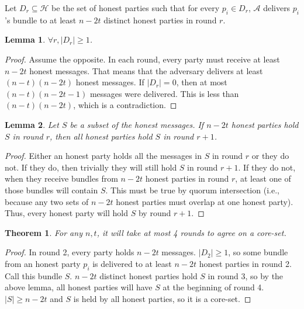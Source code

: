 \documentclass{article}
\newtheorem{lemma}{Lemma}
\newtheorem{theorem}{Theorem}
\begin{document}
Let $D_r \subseteq \mathcal H$ be the set of honest parties such that for every $p_i \in D_r$, $\mathcal A$ delivers $p_i$'s bundle to at least $n - 2t$ distinct honest parties in round $r$.
\begin{lemma}
$\forall r, |D_r| \geq 1$.
\end{lemma}
\begin{proof}
Assume the opposite. In each round, every party must receive at least $n - 2t$ honest messages. That means that the adversary delivers at least $(n-t)(n-2t)$ honest messages. If $|D_r| = 0$, then at most $(n-t)(n-2t-1)$ messages were delivered. This is less than $(n-t)(n-2t)$, which is a contradiction.
\end{proof}

\begin{lemma}
Let $S$ be a subset of the honest messages. If $n-2t$ honest parties hold $S$ in round $r$, then all honest parties hold $S$ in round $r+1$.
\end{lemma}
\begin{proof}
Either an honest party holds all the messages in $S$ in round $r$ or they do not. If they do, then trivially they will still hold $S$ in round $r+1$. If they do not, when they receive bundles from $n - 2t$ honest parties in round $r$, at least one of those bundles will contain $S$. This must be true by quorum intersection (i.e., because any two sets of $n-2t$ honest parties must overlap at one honest party). Thus, every honest party will hold $S$ by round $r+1$.
\end{proof}

\begin{theorem}
For any $n, t$, it will take at most 4 rounds to agree on a core-set.
\end{theorem}

\begin{proof}
In round 2, every party holds $n - 2t$ messages. $|D_2| \geq 1$, so some bundle from an honest party $p_i$ is delivered to at least $n - 2t$ honest parties in round 2. Call this bundle $S$. $n - 2t$ distinct honest parties hold $S$ in round 3, so by the above lemma, all honest parties will have $S$ at the beginning of round 4. $|S| \geq n - 2t$ and $S$ is held by all honest parties, so it is a core-set.
\end{proof}
\end{document}
